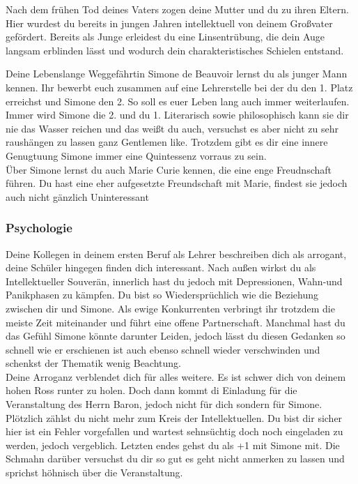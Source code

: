 \documentclass[12pt, a4paper, openany]{report}
\begin{document}
Nach dem frühen Tod deines Vaters zogen deine Mutter und du zu ihren Eltern. Hier wurdest du bereits in jungen Jahren intellektuell von deinem Großvater gefördert. Bereits als Junge erleidest du eine Linsentrübung, die dein Auge langsam erblinden lässt und wodurch dein charakteristisches Schielen entstand.

Deine Lebenslange Weggefährtin Simone de Beauvoir lernst du als junger Mann kennen. Ihr bewerbt euch zusammen auf eine Lehrerstelle bei der du den 1. Platz erreichst und Simone den 2. So soll es euer Leben lang auch immer weiterlaufen. Immer wird Simone die 2. und du 1. Literarisch sowie philosophisch kann sie dir nie das Wasser reichen und das weißt du auch, versuchst es aber nicht zu sehr raushängen zu lassen ganz Gentlemen like. Trotzdem gibt es dir eine innere Genugtuung Simone immer eine Quintessenz vorraus zu sein. \\

Über Simone lernst du auch Marie Curie kennen, die eine enge Freudnschaft führen. Du hast eine eher aufgesetzte Freundschaft mit Marie, findest sie jedoch auch nicht gänzlich Uninteressant 


 
\subsubsection{Psychologie}
Deine Kollegen in deinem ersten Beruf als Lehrer beschreiben dich als arrogant, deine Schüler hingegen finden dich interessant. Nach außen wirkst du als Intellektueller Souverän, innerlich hast du jedoch mit Depressionen, Wahn-und Panikphasen zu kämpfen. Du bist so Wiedersprüchlich wie die Beziehung zwischen dir und Simone. Als ewige Konkurrenten verbringt ihr trotzdem die meiste Zeit miteinander und führt eine offene Partnerschaft. Manchmal hast du das Gefühl Simone könnte darunter Leiden, jedoch lässt du diesen Gedanken so schnell wie er erschienen ist auch ebenso schnell wieder verschwinden und schenkst der Thematik wenig Beachtung.\\

Deine Arroganz verblendet dich für alles weitere. Es ist schwer dich von deinem hohen Ross runter zu holen. Doch dann kommt di Einladung für die Veranstaltung des Herrn Baron, jedoch nicht für dich sondern für Simone. Plötzlich zählst du nicht mehr zum Kreis der Intellektuellen. Du bist dir sicher hier ist ein Fehler vorgefallen und wartest sehnsüchtig doch noch eingeladen zu werden, jedoch vergeblich. Letzten endes gehst du als +1 mit Simone mit. Die Schmahn darüber versuchst du dir so gut es geht nicht anmerken zu lassen und sprichst höhnisch über die Veranstaltung. 
\end{document}
